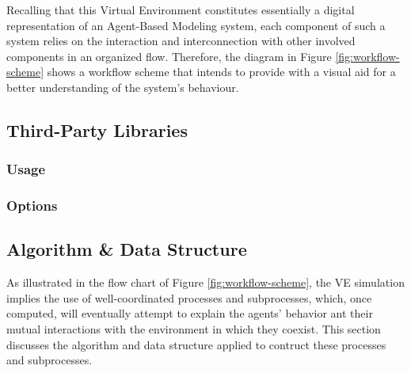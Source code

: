 Recalling that this Virtual Environment constitutes essentially a digital representation of an Agent-Based Modeling system, each component of such a system relies on the interaction and interconnection with other involved components in an organized flow. Therefore, the diagram in Figure \ref{fig:workflow-scheme} shows a workflow scheme that intends to provide with a visual aid for a better understanding of the system's behaviour.

\subsection{Third-Party Libraries}

\subsubsection{Usage}
\subsubsection{Options}

\subsection{Algorithm \& Data Structure}
As illustrated in the flow chart of Figure \ref{fig:workflow-scheme}, the VE simulation implies the use of well-coordinated processes and subprocesses, which, once computed, will eventually attempt to explain the agents' behavior ant their mutual interactions with the environment in which they coexist. This section discusses the algorithm and data structure applied to contruct these processes and subprocesses.

